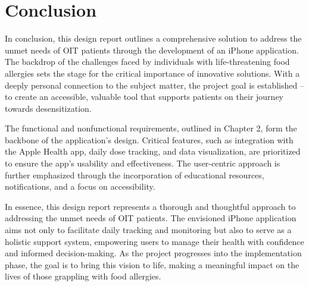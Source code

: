 \chapter{Conclusion}

In conclusion, this design report outlines a comprehensive solution to address the unmet needs of OIT patients through the development of an iPhone application. The backdrop of the challenges faced by individuals with life-threatening food allergies sets the stage for the critical importance of innovative solutions. With a deeply personal connection to the subject matter, the project goal is established – to create an accessible, valuable tool that supports patients on their journey towards desensitization.

The functional and nonfunctional requirements, outlined in Chapter 2, form the backbone of the application's design. Critical features, such as integration with the Apple Health app, daily dose tracking, and data visualization, are prioritized to ensure the app's usability and effectiveness. The user-centric approach is further emphasized through the incorporation of educational resources, notifications, and a focus on accessibility.

In essence, this design report represents a thorough and thoughtful approach to addressing the unmet needs of OIT patients. The envisioned iPhone application aims not only to facilitate daily tracking and monitoring but also to serve as a holistic support system, empowering users to manage their health with confidence and informed decision-making. As the project progresses into the implementation phase, the goal is to bring this vision to life, making a meaningful impact on the lives of those grappling with food allergies.


